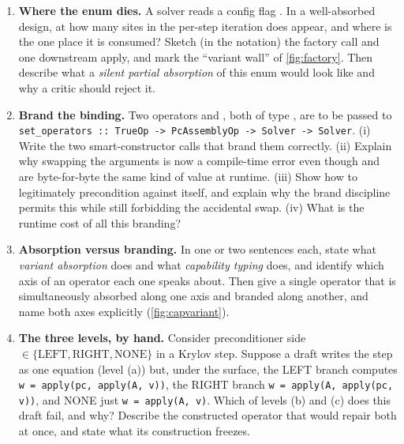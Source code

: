 \begin{enumerate}[nosep]
  a bare operator does not, and explain why hiding them from the iteration makes this a
  rotation rather than a typedef. What would have to be true for it to be \emph{only} a
  renaming?
  \item \textbf{Where the enum dies.} A solver reads a config flag
  . In a well-absorbed design, at how many sites
  in the per-step iteration does  appear, and where is the one place it is
  consumed? Sketch (in the notation) the factory call and one downstream apply, and mark
  the ``variant wall'' of \cref{fig:factory}. Then describe what a \emph{silent partial
  absorption} of this enum would look like and why a critic should reject it.
  \item \textbf{Brand the binding.} Two operators  and , both of type
  , are to be passed to
  \lstinline[style=l4style]|set_operators :: TrueOp -> PcAssemblyOp -> Solver -> Solver|.
  (i) Write the two smart-constructor calls that brand them correctly. (ii) Explain why
  swapping the arguments is now a compile-time error even though  and 
  are byte-for-byte the same kind of value at runtime. (iii) Show how to legitimately
  precondition  against itself, and explain why the brand discipline permits
  this while still forbidding the accidental swap. (iv) What is the runtime cost of all
  this branding?
  \item \textbf{Absorption versus branding.} In one or two sentences each, state what
  \emph{variant absorption} does and what \emph{capability typing} does, and identify
  which axis of an operator each one speaks about. Then give a single operator that is
  simultaneously absorbed along one axis and branded along another, and name both axes
  explicitly (\cref{fig:capvariant}).
  \item \textbf{The three levels, by hand.} Consider preconditioner side
  $\in \{\text{LEFT},\text{RIGHT},\text{NONE}\}$ in a Krylov step. Suppose a draft
  writes the step as one equation (level (a)) but, under the surface, the LEFT branch
  computes \lstinline[style=l4style]|w = apply(pc, apply(A, v))|, the RIGHT branch
  \lstinline[style=l4style]|w = apply(A, apply(pc, v))|, and NONE just
  \lstinline[style=l4style]|w = apply(A, v)|. Which of levels (b) and (c) does this draft
  fail, and why? Describe the constructed operator that would repair both at once, and
  state what its construction freezes.
\end{enumerate}
